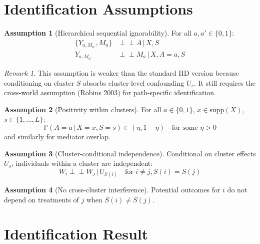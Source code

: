\documentclass[11pt]{article}
\theoremstyle{plain}
\theoremstyle{definition}
\newtheorem{assumption}{Assumption}
\theoremstyle{remark}
\newtheorem{remark}[theorem]{Remark}
\newcommand{\P}{\mathbb{P}}
\newcommand{\indep}{\perp\!\!\!\perp}
\newcommand{\given}{\,|\,}
\begin{document}
\section{Identification Assumptions}
\label{sec:identification}

\begin{assumption}[Hierarchical sequential ignorability]
\label{assump:ignorability}
For all $a, a' \in \{0,1\}$:
\begin{align}
    \{Y_{a, M_{a'}}, M_a\} &\indep A \given X, S \\
    Y_{a, M_{a'}} &\indep M_a \given X, A=a, S
\end{align}
\end{assumption}

\begin{remark}
This assumption is weaker than the standard IID version because conditioning on cluster $S$ absorbs cluster-level confounding $U_s$. It still requires the cross-world assumption (Robins 2003) for path-specific identification.
\end{remark}

\begin{assumption}[Positivity within clusters]
\label{assump:positivity}
For all $a \in \{0,1\}$, $x \in \text{supp}(X)$, $s \in \{1, \dots, L\}$:
\begin{equation}
    \P(A = a \given X = x, S = s) \in (\eta, 1-\eta) \quad \text{for some } \eta > 0
\end{equation}
and similarly for mediator overlap.
\end{assumption}

\begin{assumption}[Cluster-conditional independence]
\label{assump:cluster}
Conditional on cluster effects $U_s$, individuals within a cluster are independent:
\begin{equation}
    W_i \indep W_j \given U_{S(i)} \quad \text{for } i \neq j, S(i) = S(j)
\end{equation}
\end{assumption}

\begin{assumption}[No cross-cluster interference]
\label{assump:no-interference}
Potential outcomes for $i$ do not depend on treatments of $j$ when $S(i) \neq S(j)$.
\end{assumption}

\section{Identification Result}
\label{sec:identification-result}
\end{document}
